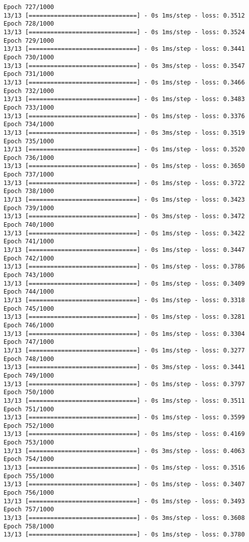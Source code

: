 \documentclass[11pt]{article}
\begin{document}
\begin{Verbatim}[commandchars=\\\{\}]
Epoch 727/1000
13/13 [==============================] - 0s 1ms/step - loss: 0.3512
Epoch 728/1000
13/13 [==============================] - 0s 1ms/step - loss: 0.3524
Epoch 729/1000
13/13 [==============================] - 0s 1ms/step - loss: 0.3441
Epoch 730/1000
13/13 [==============================] - 0s 3ms/step - loss: 0.3547
Epoch 731/1000
13/13 [==============================] - 0s 1ms/step - loss: 0.3466
Epoch 732/1000
13/13 [==============================] - 0s 1ms/step - loss: 0.3483
Epoch 733/1000
13/13 [==============================] - 0s 1ms/step - loss: 0.3376
Epoch 734/1000
13/13 [==============================] - 0s 3ms/step - loss: 0.3519
Epoch 735/1000
13/13 [==============================] - 0s 1ms/step - loss: 0.3520
Epoch 736/1000
13/13 [==============================] - 0s 1ms/step - loss: 0.3650
Epoch 737/1000
13/13 [==============================] - 0s 1ms/step - loss: 0.3722
Epoch 738/1000
13/13 [==============================] - 0s 1ms/step - loss: 0.3423
Epoch 739/1000
13/13 [==============================] - 0s 3ms/step - loss: 0.3472
Epoch 740/1000
13/13 [==============================] - 0s 1ms/step - loss: 0.3422
Epoch 741/1000
13/13 [==============================] - 0s 1ms/step - loss: 0.3447
Epoch 742/1000
13/13 [==============================] - 0s 1ms/step - loss: 0.3786
Epoch 743/1000
13/13 [==============================] - 0s 1ms/step - loss: 0.3409
Epoch 744/1000
13/13 [==============================] - 0s 1ms/step - loss: 0.3318
Epoch 745/1000
13/13 [==============================] - 0s 1ms/step - loss: 0.3281
Epoch 746/1000
13/13 [==============================] - 0s 1ms/step - loss: 0.3304
Epoch 747/1000
13/13 [==============================] - 0s 1ms/step - loss: 0.3277
Epoch 748/1000
13/13 [==============================] - 0s 3ms/step - loss: 0.3441
Epoch 749/1000
13/13 [==============================] - 0s 1ms/step - loss: 0.3797
Epoch 750/1000
13/13 [==============================] - 0s 1ms/step - loss: 0.3511
Epoch 751/1000
13/13 [==============================] - 0s 1ms/step - loss: 0.3599
Epoch 752/1000
13/13 [==============================] - 0s 1ms/step - loss: 0.4169
Epoch 753/1000
13/13 [==============================] - 0s 3ms/step - loss: 0.4063
Epoch 754/1000
13/13 [==============================] - 0s 1ms/step - loss: 0.3516
Epoch 755/1000
13/13 [==============================] - 0s 1ms/step - loss: 0.3407
Epoch 756/1000
13/13 [==============================] - 0s 1ms/step - loss: 0.3493
Epoch 757/1000
13/13 [==============================] - 0s 3ms/step - loss: 0.3608
Epoch 758/1000
13/13 [==============================] - 0s 1ms/step - loss: 0.3780

\end{Verbatim}
\end{document}
